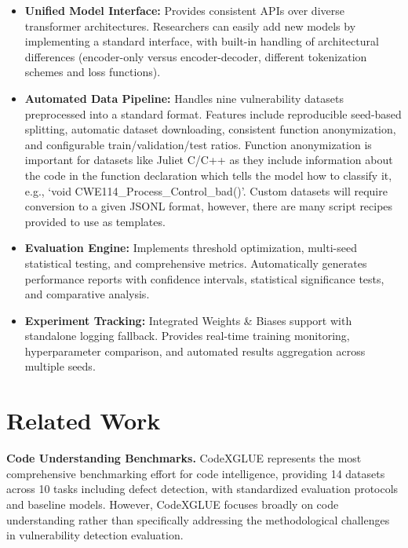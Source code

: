 \documentclass[letterpaper]{article}
\begin{document}
\begin{itemize}
	\item \textbf{Unified Model Interface:} Provides consistent APIs over diverse transformer architectures. Researchers can easily add new models by implementing a standard interface, with built-in handling of architectural differences (encoder-only versus encoder-decoder, different tokenization schemes and loss functions).

	\item \textbf{Automated Data Pipeline:} Handles nine vulnerability datasets preprocessed into a standard format. Features
	      include reproducible seed-based splitting, automatic dataset downloading, consistent function anonymization, and configurable train/validation/test ratios. Function anonymization is important for datasets like Juliet C/C++ \citep{juliet2022} as they include information about the code in the function declaration which tells the model how to classify it, e.g., `void CWE114\_Process\_Control\_bad()'. Custom datasets will require conversion to a given JSONL format, however, there are many script recipes provided to use as templates.

	\item \textbf{Evaluation Engine:} Implements threshold optimization, multi-seed statistical testing, and comprehensive metrics. Automatically generates performance reports with confidence intervals, statistical significance tests, and comparative analysis.

	\item \textbf{Experiment Tracking:} Integrated Weights \& Biases support with standalone logging fallback. Provides real-time training monitoring, hyperparameter comparison, and automated results aggregation across multiple seeds.
\end{itemize}

\section{Related Work}

\textbf{Code Understanding Benchmarks.} CodeXGLUE \citep{lu2021codexglue} represents the most comprehensive benchmarking effort for code intelligence, providing 14 datasets across 10 tasks including defect detection, with standardized evaluation protocols and baseline models. However, CodeXGLUE focuses broadly on code understanding rather than specifically addressing the methodological challenges in vulnerability detection evaluation.
\end{document}
